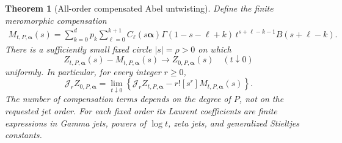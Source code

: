 \documentclass[11pt]{article}
\numberwithin{equation}{section}
\newtheorem{theorem}{Theorem}[section]
\theoremstyle{definition}\newtheorem{definition}[theorem]{Definition}
\theoremstyle{remark}\newtheorem{remark}[theorem]{Remark}\newtheorem{example}[theorem]{Example}
\newcommand{\calJ}{\mathcal J}\newcommand{\calZ}{\mathcal Z}
\begin{document}
\begin{theorem}[All-order compensated Abel untwisting]\label{asj:thm:untwist}
Define the finite meromorphic compensation
\begin{align}\label{asj:eq:general-counter}
 M_{t,P,\boldsymbol\alpha}(s)
  =\sum_{k=0}^d p_k\sum_{\ell=0}^{k+1}
      C_\ell(s\boldsymbol\alpha)
      \Gamma(1-s-\ell+k)\,
       t^{s+\ell-k-1} B(s+\ell-k).
\end{align}
There is a sufficiently small fixed circle $|s|=\rho>0$ on which
\begin{equation}\label{asj:eq:uniform-untwist}
 Z_{t,P,\boldsymbol\alpha}(s)-M_{t,P,\boldsymbol\alpha}(s)
      \longrightarrow Z_{0,P,\boldsymbol\alpha}(s)
       \quad(t\downarrow0)
\end{equation}
uniformly. In particular, for every integer $r\ge0$,
\begin{equation}\label{asj:eq:jet-untwist}
 \boxed{\displaystyle
 \calJ_r Z_{0,P,\boldsymbol\alpha}
   =\lim_{t\downarrow0}\left\{
      \calJ_r Z_{t,P,\boldsymbol\alpha}
                 -r![s^r]M_{t,P,\boldsymbol\alpha}(s)\right\}.}
\end{equation}
The number of compensation terms depends on the degree of $P$, not on
the requested jet order. For each fixed order its Laurent coefficients
are finite expressions in Gamma jets, powers of $\log t$, zeta jets,
and generalized Stieltjes constants.
\end{theorem}
\end{document}
